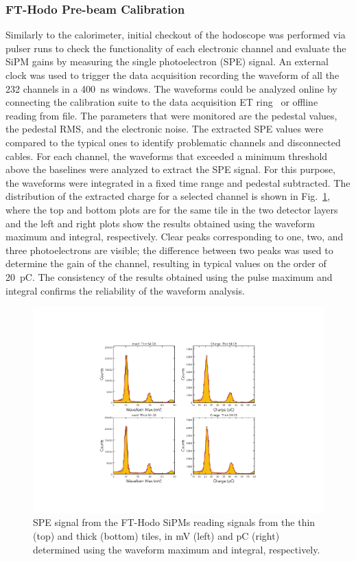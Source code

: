 \subsubsection{FT-Hodo Pre-beam Calibration}

Similarly to the calorimeter, initial checkout of the hodoscope was performed via pulser runs to check the functionality
of each electronic channel and evaluate the SiPM gains by measuring the single photoelectron (SPE) signal. An external
clock was used to trigger the data acquisition recording the waveform of all the 232 channels in a 400~ns windows.
The waveforms could be analyzed online by connecting the calibration suite to the data acquisition ET ring~\cite{daq}
or offline reading from file. The parameters that were monitored are the pedestal values, the pedestal RMS, and the
electronic noise. The extracted SPE values were compared to the typical ones to identify problematic channels and
disconnected cables. For each channel, the waveforms that exceeded a minimum threshold above the baselines were
analyzed to extract the SPE signal. For this purpose, the waveforms were integrated in a fixed time range and pedestal
subtracted. The distribution of the extracted charge for a selected channel is shown in Fig.~\ref{fig:fthodo_spe}, where the top and bottom plots are for the same tile in the two detector layers and the left and right plots show the results obtained using the waveform maximum and integral, respectively.
Clear peaks corresponding to one, two, and three photoelectrons are visible; the difference between two peaks was used
to determine the gain of the channel, resulting in typical values on the order of 20~pC. The consistency of the results obtained using the pulse maximum and integral confirms the reliability of the waveform analysis.

\begin{figure}
\includegraphics[width=1.0\columnwidth]{fig/fthodo_spe_2.pdf}
\caption{SPE signal from the FT-Hodo SiPMs reading signals from the thin (top) and thick (bottom) tiles, in mV
  (left) and pC (right) determined using the waveform maximum and integral, respectively.}
\label{fig:fthodo_spe}
\end{figure}


